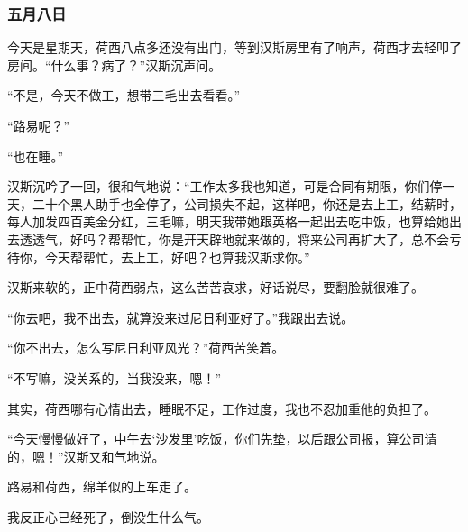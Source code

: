 \subsubsection{五月八日}
\par 今天是星期天，荷西八点多还没有出门，等到汉斯房里有了响声，荷西才去轻叩了房间。“什么事？病了？”汉斯沉声问。
\par “不是，今天不做工，想带三毛出去看看。”
\par “路易呢？”
\par “也在睡。”
\par 汉斯沉吟了一回，很和气地说：“工作太多我也知道，可是合同有期限，你们停一天，二十个黑人助手也全停了，公司损失不起，这样吧，你还是去上工，结薪时，每人加发四百美金分红，三毛嘛，明天我带她跟英格一起出去吃中饭，也算给她出去透透气，好吗？帮帮忙，你是开天辟地就来做的，将来公司再扩大了，总不会亏待你，今天帮帮忙，去上工，好吧？也算我汉斯求你。”
\par 汉斯来软的，正中荷西弱点，这么苦苦哀求，好话说尽，要翻脸就很难了。
\par “你去吧，我不出去，就算没来过尼日利亚好了。”我跟出去说。
\par “你不出去，怎么写尼日利亚风光？”荷西苦笑着。
\par “不写嘛，没关系的，当我没来，嗯！”
\par 其实，荷西哪有心情出去，睡眠不足，工作过度，我也不忍加重他的负担了。
\par “今天慢慢做好了，中午去‘沙发里’吃饭，你们先垫，以后跟公司报，算公司请的，嗯！”汉斯又和气地说。
\par 路易和荷西，绵羊似的上车走了。
\par 我反正心已经死了，倒没生什么气。



